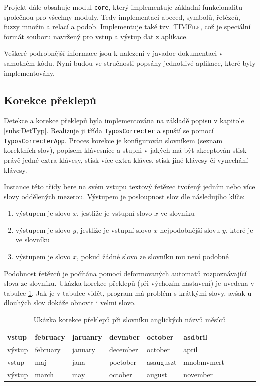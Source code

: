 \documentclass[a4paper,10pt]{article}
\begin{document}
Projekt dále obsahuje modul \verb|core|, který implementuje základní funkcionalitu společnou pro všechny moduly. Tedy implementaci abeced, symbolů, řetězců, fuzzy množin a relací a podob. Implementuje také tzv. \textsc{TIMFile}, což je speciální formát souboru navržený pro vstup a výstup dat z aplikace.

Veškeré podrobnější informace jsou k nalezení v javadoc dokumentaci v samotném kódu. Nyní budou ve stručnosti popsány jednotlivé aplikace, které byly implementovány.


\subsection{Korekce překlepů}
Detekce a korekce překlepů byla implementována na základě popisu v kapitole \ref{subs:DetTyp}. Realizuje ji třída \verb|TyposCorrecter| a spuští se pomocí \verb|TyposCorrecterApp|. Proces korekce je konfigurován slovníkem (seznam korektních slov), popisem klávesnice a stupni v jakých má být akceptován stisk právě jedné extra klávesy, stisk více extra kláves, stisk jiné klávesy či vynechání klávesy.

Instance této třídy bere na svém vstupu textový řetězec tvořený jedním nebo více slovy oddělených mezerou. Výstupem je posloupnost slov dle následujího klíče:
\begin{enumerate}
 \item výstupem je slovo $x$, jestliže je vstupní slovo $x$ ve slovníku
 \item výstupem je slovo $y$, jestliže je vstupní slovo $x$ nejpodobnější slovu $y$, které je ve slovníku
 \item výstupem je slovo $x$, pokud žádné slovo ze slovníku mu není podobné
\end{enumerate}

Podobnost řetězců je počítána pomocí deformovaných automatů rozpoznávající slova ze slovníku. Ukázka korekce překlepů (při výchozím nastavení) je uvedena v tabulce \ref{tab:TyposOut}. Jak je v tabulce vidět, program má problém s krátkými slovy, avšak u dlouhých slov dokáže obnovit i velmi  slovo.

\begin{table}
 \centering
  \begin{tabular}{|l||l|l|l|l|l|l|l|l|l|}
    \hline
    vstup 	& februacy & jaruanry & devmber  & october & asdbril	\\\hline
    výstup 	& february & january  & december & october & april	\\\hline
    \hline
    vstup 	& maj   & jana & poctober & asauguszt  & mnobmvmert	\\\hline
    výstup	& march & may  & october  & august     & november	\\\hline
  \end{tabular}

 \caption{Ukázka korekce překlepů při slovníku anglických názvů měsíců} \label{tab:TyposOut}
\end{table}
\end{document}
